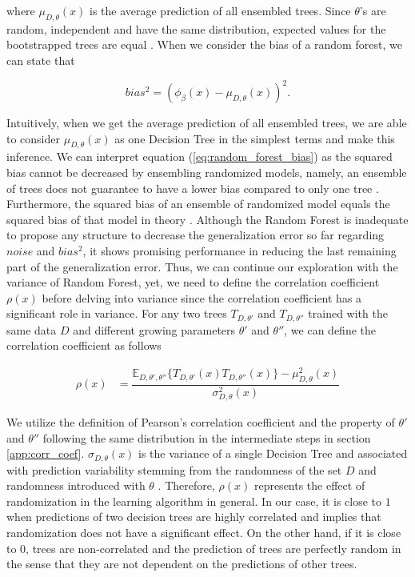 where $\mu_{D,\theta}(x)$ is the average prediction of all ensembled trees. Since $\theta$'s are random, 
independent and have the same distribution, expected values for the bootstrapped trees are equal \cite{louppe2014understanding}. 
When we consider the bias of a random forest, we can state that

\begin{equation}\label{eq:random_forest_bias}
bias^2 = (\phi_{\beta}(x) - \mu_{D,\theta}(x))^2.
\end{equation}

Intuitively, when we get the average prediction of all ensembled trees, 
we are able to consider $\mu_{D,\theta}(x)$ as one Decision Tree in the simplest terms and make this inference.
We can interpret equation (\ref{eq:random_forest_bias}) as the squared bias 
cannot be decreased by ensembling randomized models, namely, 
an ensemble of trees does not guarantee to have a lower bias compared to only one tree \cite{friedman2001elements}. 
Furthermore, the squared bias of an ensemble of randomized model equals the squared bias of that model in theory \cite{louppe2014understanding}. 
Although the Random Forest is inadequate to propose any structure to decrease the generalization error so far regarding $noise$
and $bias^2$, it shows promising performance in reducing the last remaining part of the generalization error.
Thus, we can continue our exploration with the variance of Random Forest, yet, 
we need to define the correlation coefficient $\rho(x)$
before delving into variance since the correlation coefficient has a significant role in variance. 
For any two trees $T_{D,\theta'}$ and $T_{D,\theta''}$ trained with the same data $D$
and different growing parameters $\theta'$ and $\theta''$, we can define the correlation coefficient as follows

\begin{align}
	\rho(x) & 
	= \dfrac{\mathbb{E}_{D,\theta',\theta''}\{T_{D,\theta'}(x) T_{D,\theta''}(x)\} 
	- \mu_{D,\theta}^2(x)}{\sigma_{D,\theta}^2(x)}
\end{align}

We utilize the definition of Pearson's correlation coefficient and the property of $\theta'$ and $\theta''$ following 
the same distribution in the intermediate steps in section \ref{app:corr_coef}. 
$\sigma_{D, \theta}(x)$ is the variance of a single Decision Tree and 
associated with prediction variability stemming from the randomness of the set $D$ 
and randomness introduced with $\theta$ \cite{louppe2014understanding}.
Therefore, $\rho(x)$ represents the effect of randomization in the learning algorithm in general.
In our case, it is close to $1$ when predictions of two decision trees are highly correlated and implies that randomization 
does not have a significant effect. 
On the other hand, if it is close to 0, trees are non-correlated and 
the prediction of trees are perfectly random in the sense that they are 
not dependent on the predictions of other trees. 


